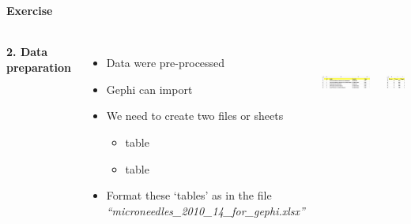 \documentclass[8pt]{beamer}
\begin{document}
\begin{frame}
\frametitle{\insertsection}
\framesubtitle{Exercise}

\begin{columns}

\textbf{2. Data preparation}
\begin{itemize}
	\item Data were pre-processed 
	\item Gephi can import {\color{teal}{Excel files}}
	\item We need to create two files or sheets
	\begin{itemize}
		\item {\color{teal}{Nodes}} table
		\item {\color{teal}{Edges}} table
	\end{itemize}
	\item Format these `tables' as in the file  \textit{``microneedles\_2010\_14\_for\_gephi.xlsx''}
\end{itemize}


\footnotesize
\centering
{\color{teal}{Nodes table}}\\ 
\includegraphics[height = 1.5cm]{gephi_nodes}\\

\medskip
\medskip

{\color{teal}{Edges table}}\\
\includegraphics[height = 1.5cm]{gephi_edges}\\

\end{columns}

\end{frame}

\end{document}
